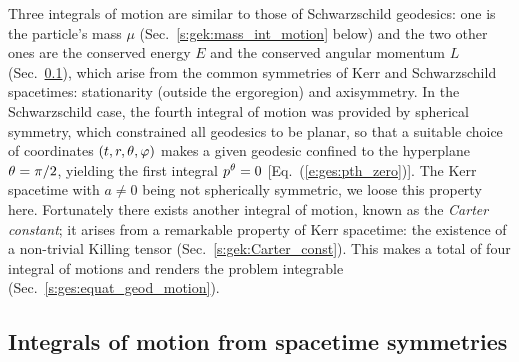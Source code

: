 Three integrals of motion are similar to those of Schwarzschild geodesics:
one is the particle's mass $\mu$ (Sec.~\ref{s:gek:mass_int_motion} below)
and the two other ones are
the conserved energy $E$ and the conserved angular momentum
$L$ (Sec.~\ref{s:gek:int_motion_sym}), which arise from the common symmetries
of Kerr and Schwarzschild spacetimes: stationarity (outside the ergoregion) and axisymmetry.
In the Schwarzschild case, the fourth integral of motion was provided by
spherical symmetry, which constrained all geodesics to be planar, so that
a suitable choice of
coordinates $(t,r,\theta,\varphi)$ makes a given geodesic confined to the
hyperplane $\theta=\pi/2$, yielding the first integral $p^\theta=0$ [Eq.~(\ref{e:ges:pth_zero})].
The Kerr spacetime with $a\not=0$ being not spherically symmetric, we loose
this property here. Fortunately there exists another
integral of motion, known as the \emph{Carter constant}; it arises from a remarkable property
of Kerr spacetime: the existence of a non-trivial Killing tensor (Sec.~\ref{s:gek:Carter_const}).
This makes a total of four integral of motions and renders the problem integrable (Sec.~\ref{s:ges:equat_geod_motion}).


\subsection{Integrals of motion from spacetime symmetries} \label{s:gek:int_motion_sym}

